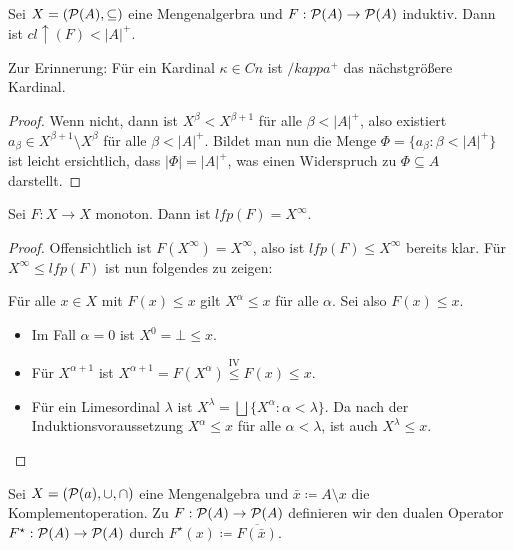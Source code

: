 \begin{lemma}
	Sei $X=(\mathcal{P}(A),\subseteq)$ eine Mengenalgerbra und $F:\mathcal{P}(A)\to\mathcal{P}(A)$ induktiv. Dann ist $cl\uparrow(F)< \vert A\vert ^+$.
\end{lemma}
Zur Erinnerung: Für ein Kardinal $\kappa\in Cn$ ist $/kappa^+$ das nächstgrößere Kardinal.
\begin{proof}
	Wenn nicht, dann ist $X^\beta < X^{\beta+1}$ für alle $\beta<\vert A \vert^+$, also existiert $a_\beta\in X^{\beta+1}\setminus X^\beta$ für alle $\beta < \vert A \vert^+$. Bildet man nun die Menge $\Phi=\{a_\beta : \beta < \vert A\vert^+\}$ ist leicht ersichtlich, dass $\vert\Phi\vert=\vert A\vert^+$, was einen Widerspruch zu $\Phi\subseteq A$ darstellt.
\end{proof} 

\begin{satz}
	Sei $F:X\to X$ monoton. Dann ist $lfp(F)=X^\infty$.
\end{satz}
\begin{proof}
	Offensichtlich ist $F(X^\infty)=X^\infty$, also ist $lfp(F)\leq X^\infty$ bereits klar. Für $X^\infty \leq lfp(F)$ ist nun folgendes zu zeigen:
	
	Für alle $x\in X$ mit $F(x)\leq x$ gilt $X^\alpha \leq x$ für alle $\alpha$. Sei also $F(x)\leq x$.
	\begin{itemize}
		\item Im Fall $\alpha=0$ ist $X^0=\bot\leq x$.
		\item Für $X^{\alpha+1}$ ist $X^{\alpha+1}=F(X^\alpha)\overset{\text{IV}}{\leq} F(x)\leq x$.
		\item Für ein Limesordinal $\lambda$ ist $X^\lambda=\bigsqcup\{X^\alpha : \alpha<\lambda\}$. Da nach der Induktionsvoraussetzung $X^\alpha \leq x$ für alle $\alpha<\lambda$, ist auch $X^\lambda\leq x$.
	\end{itemize}
\end{proof}

Sei $X=(\mathcal{P}(a),\cup,\cap)$ eine Mengenalgebra und $\bar{x}\coloneqq A\setminus x$ die Komplementoperation.
Zu $F:\mathcal{P}(A)\to \mathcal{P}(A)$ definieren wir den dualen Operator $F^\star:\mathcal{P}(A)\to\mathcal{P}(A)$ durch $F^\star(x)\coloneqq \overline{F(\bar{x})}$.

